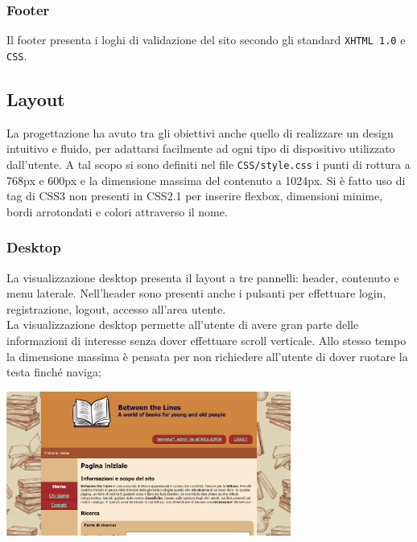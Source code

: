 \documentclass[12pt,a4paper,headings=optiontohead]{article}
\begin{document}
	
	
	
	
	
	\subsubsection{Footer}
	
	Il footer presenta i loghi di validazione del sito secondo gli standard \texttt{XHTML 1.0} e \texttt{CSS}.
	
	
	\subsection{Layout}
	La progettazione ha avuto tra gli obiettivi anche quello di realizzare un design intuitivo e fluido, per adattarsi facilmente ad ogni tipo di dispositivo utilizzato dall'utente.
	A tal scopo si sono definiti nel file \texttt{CSS/style.css} i punti di rottura a 768px e 600px e la dimensione massima del contenuto a 1024px.
	Si è fatto uso di tag di CSS3 non presenti in CSS2.1 per inserire flexbox, dimensioni minime, bordi arrotondati e colori attraverso il nome.
	
	
	\subsubsection{Desktop}
	La visualizzazione desktop presenta il layout a tre pannelli: header, contenuto e menu laterale. Nell'header sono presenti anche i pulsanti per effettuare login, registrazione, logout, accesso all'area utente.\\
	La visualizzazione desktop permette all'utente di avere gran parte delle informazioni di interesse senza dover effettuare scroll verticale. Allo stesso tempo la dimensione massima è pensata per non richiedere all'utente di dover ruotare la testa finché naviga;
	\begin{center}
	\includegraphics[width=0.7\textwidth]{layout_relazione/desktop.png}
	\end{center}
\end{document}
